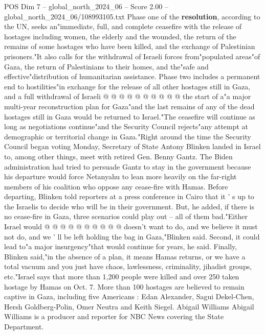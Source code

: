 \begin{textsample}{POS Dim 7 – global\_north\_2024\_06 – Score 2.00 – global\_north\_2024\_06/108993105.txt}
Phase one of the \textbf{resolution}, according to the UN, seeks an"immediate, full, and complete ceasefire with the release of hostages including women, the elderly and the wounded, the return of the remains of some hostages who have been killed, and the exchange of Palestinian prisoners."It also calls for the withdrawal of Israeli forces from"populated areas"of Gaza, the return of Palestinians to their homes, and the"safe and effective"distribution of humanitarian assistance.
Phase two includes a permanent end to hostilities"in exchange for the release of all other hostages still in Gaza, and a full withdrawal of Israeli @ @ @ @ @ @ @ @ @ @ the start of a"a major multi-year reconstruction plan for Gaza"and the last remains of any of the dead hostages still in Gaza would be returned to Israel."The ceasefire will continue as long as negotiations continue"and the Security Council rejects"any attempt at demographic or territorial change in Gaza."Right around the time the Security Council began voting Monday, Secretary of State Antony Blinken landed in Israel to, among other things, meet with retired Gen.
Benny Gantz.
The Biden administration had tried to persuade Gantz to stay in the government because his departure would force Netanyahu to lean more heavily on the far-right members of his coalition who oppose any cease-fire with Hamas.
Before departing, Blinken told reporters at a press conference in Cairo that it ' s up to the Israelis to decide who will be in their government.
But, he added, if there is no cease-fire in Gaza, three scenarios could play out -- all of them bad."Either Israel would @ @ @ @ @ @ @ @ @ @ doesn't want to do, and we believe it must not do, and we ' ll be left holding the bag in Gaza,"Blinken said.
Second, it could lead to"a major insurgency"that would continue for years, he said.
Finally, Blinken said,"in the absence of a plan, it means Hamas returns, or we have a total vacuum and you just have chaos, lawlessness, criminality, jihadist groups, etc."Israel says that more than 1,200 people were killed and over 250 taken hostage by Hamas on Oct. 7.
More than 100 hostages are believed to remain captive in Gaza, including five Americans : Edan Alexander, Sagui Dekel-Chen, Hersh Goldberg-Polin, Omer Neutra and Keith Siegel.
Abigail Williams Abigail Williams is a producer and reporter for NBC News covering the State Department.

\end{textsample}
